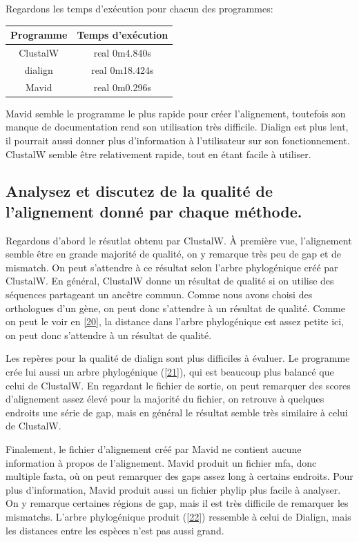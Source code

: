 \documentclass[10.8pt]{article} %
\begin{document}
Regardons les temps d'exécution pour chacun des programmes:
\begin{tabular}{|c|c|}
 \hline
 Programme & Temps d'exécution \\
 \hline
 ClustalW & real 0m4.840s \\
 \hline
 dialign & real 0m18.424s \\
 \hline
 Mavid & real 0m0.296s\\
 \hline
\end{tabular}

Mavid semble le programme le plus rapide pour créer l'alignement, toutefois son manque de documentation rend son utilisation
très difficile. Dialign est plus lent, il pourrait aussi donner plus d'information à l'utilisateur sur son fonctionnement.
ClustalW semble être relativement rapide, tout en étant facile à utiliser.

\subsection[Qualité des alignements]{Analysez et discutez de la qualité de l'alignement donné par chaque méthode.}

Regardons d'abord le résutlat obtenu par ClustalW. À première vue, l'alignement semble être en grande majorité de qualité,
on y remarque très peu de gap et de mismatch. On peut s'attendre à ce résultat selon l'arbre phylogénique
créé par ClustalW. En général, ClustalW donne un résultat de qualité si on utilise des séquences partageant un ancêtre commun.
Comme nous avons choisi des orthologues d'un gène, on peut donc s'attendre à un résultat de qualité. Comme on peut le voir en
\ref{20}, la distance dans l'arbre phylogénique est assez petite ici, on peut donc s'attendre à un résultat de qualité.

Les repères pour la qualité de dialign sont plus difficiles à évaluer. Le programme crée lui aussi un arbre phylogénique (\ref{21}),
qui est beaucoup plus balancé que celui de ClustalW. En regardant le fichier de sortie, on peut remarquer des scores 
d'alignement assez élevé pour la majorité du fichier, on retrouve à quelques endroits une série de gap, mais en général le résultat
semble très similaire à celui de ClustalW.

Finalement, le fichier d'alignement créé par Mavid ne contient aucune information à propos de l'alignement. Mavid produit un fichier
mfa, donc multiple fasta, où on peut remarquer des gaps assez long à certains endroits. Pour plus d'information, Mavid produit
aussi un fichier phylip plus facile à analyser. On y remarque certaines régions de gap, mais il est très difficile
de remarquer les mismatchs. L'arbre phylogénique produit (\ref{22}) ressemble à celui de Dialign, mais les distances entre les
espèces n'est pas aussi grand.
\end{document}
